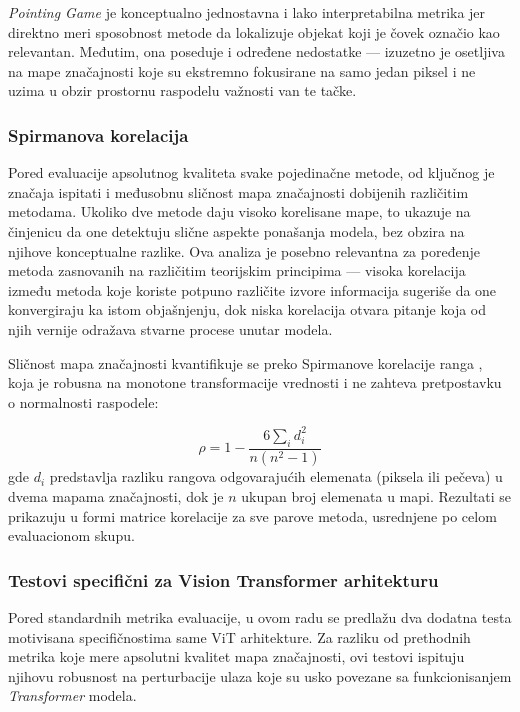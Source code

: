 \textit{Pointing Game} je konceptualno jednostavna i lako interpretabilna metrika jer direktno meri sposobnost metode da lokalizuje objekat koji je čovek označio kao relevantan. 
Međutim, ona poseduje i određene nedostatke — izuzetno je osetljiva na mape značajnosti koje su 
ekstremno fokusirane na samo jedan piksel i ne uzima u obzir prostornu raspodelu 
važnosti van te tačke.

\subsubsection{Spirmanova korelacija}

Pored evaluacije apsolutnog kvaliteta svake pojedinačne metode, od ključnog je 
značaja ispitati i međusobnu sličnost mapa značajnosti dobijenih različitim metodama. 
Ukoliko dve metode daju visoko korelisane mape, to ukazuje na činjenicu da one 
detektuju slične aspekte ponašanja modela, bez obzira na njihove konceptualne razlike. 
Ova analiza je posebno relevantna za poređenje metoda zasnovanih na različitim teorijskim 
principima — visoka korelacija između metoda koje koriste potpuno različite izvore 
informacija sugeriše da one konvergiraju ka istom objašnjenju, dok niska korelacija 
otvara pitanje koja od njih vernije odražava stvarne procese unutar modela.

Sličnost mapa značajnosti kvantifikuje se preko Spirmanove korelacije ranga 
\cite{spearman1904}, koja je robusna na monotone transformacije vrednosti 
i ne zahteva pretpostavku o normalnosti raspodele:

\begin{equation}
    \rho = 1 - \frac{6 \sum_i d_i^2}{n(n^2-1)}
\end{equation}
gde $d_i$ predstavlja razliku rangova odgovarajućih elemenata (piksela ili pečeva) u dvema mapama značajnosti, 
dok je $n$ ukupan broj elemenata u mapi. Rezultati se prikazuju u formi matrice korelacije 
za sve parove metoda, usrednjene po celom evaluacionom skupu.

\subsubsection{Testovi specifični za Vision Transformer arhitekturu}

Pored standardnih metrika evaluacije, u ovom radu se predlažu dva dodatna 
testa motivisana specifičnostima same ViT arhitekture. Za razliku od prethodnih 
metrika koje mere apsolutni kvalitet mapa značajnosti, ovi testovi ispituju 
njihovu robusnost na perturbacije ulaza koje su usko povezane sa 
funkcionisanjem \textit{Transformer} modela.

